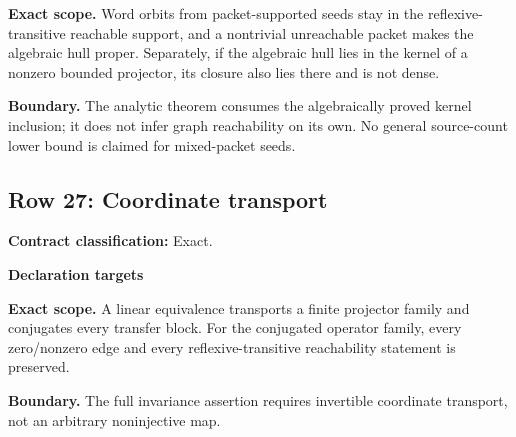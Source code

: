 {\small\noindent{}\par}
{\small\noindent{}\par}
{\small\noindent{}\par}
{\small\noindent{}\par}
\medskip\noindent\textbf{Exact scope.} Word orbits from packet-supported seeds stay in the reflexive-transitive reachable support, and a nontrivial unreachable packet makes the algebraic hull proper. Separately, if the algebraic hull lies in the kernel of a nonzero bounded projector, its closure also lies there and is not dense.
\par\smallskip\noindent\textbf{Boundary.} The analytic theorem consumes the algebraically proved kernel inclusion; it does not infer graph reachability on its own. No general source-count lower bound is claimed for mixed-packet seeds.
\medskip
{}\subsection{Row 27: Coordinate transport}
\label{row:27}
\textbf{Contract classification:} Exact.
\par\smallskip\textbf{Declaration targets}\par
{\small\noindent{}\par}
{\small\noindent{}\par}
{\small\noindent{}\par}
{\small\noindent{}\par}
\medskip\noindent\textbf{Exact scope.} A linear equivalence transports a finite projector family and conjugates every transfer block. For the conjugated operator family, every zero/nonzero edge and every reflexive-transitive reachability statement is preserved.
\par\smallskip\noindent\textbf{Boundary.} The full invariance assertion requires invertible coordinate transport, not an arbitrary noninjective map.
